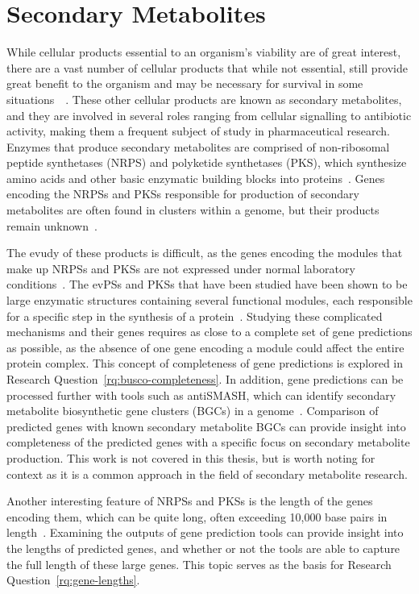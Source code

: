 \section{Secondary Metabolites}
\label{lit:secondary-metabolites}

While cellular products essential to an organism's viability are
of great interest, there are a vast number of cellular products that while not
essential, still provide great benefit to the
organism and may be necessary for survival in some situations~\cite{Craney2013}~\cite{Mukherjee2012}. These other cellular products are known
 as secondary metabolites, and they are involved in several roles ranging 
 from cellular signalling to antibiotic activity, making them a frequent 
 subject of study in pharmaceutical research. Enzymes that produce 
 secondary metabolites are comprised of non-ribosomal peptide synthetases 
 (NRPS) and polyketide synthetases (PKS), which synthesize amino acids and 
 other basic enzymatic building blocks into proteins~\cite{komaki2020}. 
 Genes encoding the NRPSs and PKSs responsible for production of secondary 
 metabolites are often found in clusters within a genome, but their 
 products remain unknown~\cite{Mukherjee2012}. 
 
 The evudy of these products is difficult, as the genes encoding the modules that make up NRPSs and PKSs are not expressed under normal laboratory conditions~\cite{Mukherjee2012}. The evPSs and PKSs that have been studied
 have been shown to be large enzymatic structures containing several 
 functional modules, each responsible for a specific step in the synthesis 
 of a protein~\cite{Mukherjee2012}. Studying these complicated mechanisms and their genes requires as close to a complete set of gene predictions as possible, as the absence of one gene encoding a module could affect the entire protein complex. This concept of completeness of gene predictions is explored in Research Question~\ref{rq:busco-completeness}. 
 In addition, gene predictions can be processed further with tools such as antiSMASH, which can identify secondary metabolite biosynthetic gene clusters (BGCs) in a genome~\cite{blin2023}. Comparison of predicted genes with known secondary metabolite BGCs can provide insight into completeness of the predicted genes with a specific focus on secondary metabolite production. This work is not covered in this thesis, but is worth noting for context as it is a common approach in the field of secondary metabolite research.

 Another interesting feature of NRPSs and PKSs is the length of the genes encoding them, which can be quite long, often exceeding 10,000 base pairs in length~\cite{komaki2020}. Examining the outputs of gene prediction tools can provide insight into the lengths of predicted genes, and whether or not the tools are able to capture the full length of these large genes. This topic serves as the basis for Research Question~\ref{rq:gene-lengths}.  

